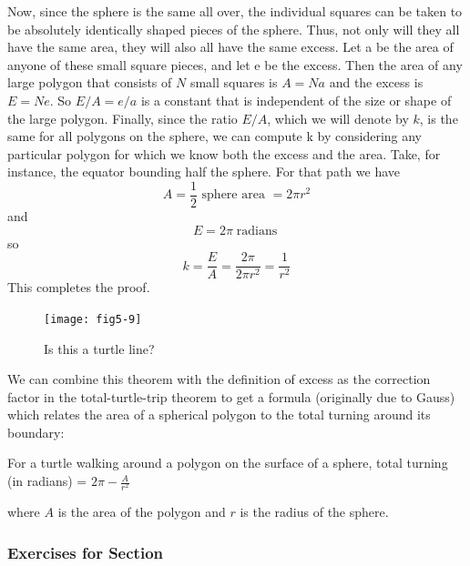 \documentclass{book}
\begin{document}
Now, since the sphere is the same all over, the individual squares can
be taken to be absolutely identically shaped pieces of the sphere. Thus,
not only will they all have the same area, they will also all have the same
excess. Let a be the area of anyone of these small square pieces, and let
e be the excess. Then the area of any large polygon that consists of $N$
small squares is $A = Na$ and the excess is $E = Ne$. So $E/A = e/a$ is
a constant that is independent of the size or shape of the large polygon.
Finally, since the ratio $E / A$, which we will denote by $k$, is the same
for all polygons on the sphere, we can compute k by considering any
particular polygon for which we know both the excess and the area.
Take, for instance, the equator bounding half the sphere. For that path
we have
$$A = \frac{1}{2} \text{ sphere area } = 2 \pi r^2$$
 and
$$E = 2 \pi \operatorname{radians}$$
 so
$$k = \frac{E}{A}=\frac{2 \pi}{2 \pi r^2}=\frac{1}{r^2}$$
 This completes the proof.

\begin{figure}
\begin{center}
\texttt{[image: fig5-9]}
\caption{Is this a turtle line?}
\end{center}
\end{figure}

We can combine this theorem with the definition of excess as the 
correction factor in the total-turtle-trip theorem to get a formula (originally
due to Gauss) which relates the area of a spherical polygon to the total
turning around its boundary:

For a turtle walking around a polygon on the surface of a sphere,
total turning (in radians) = $2 \pi - \frac{A}{r^2}$

where $A$ is the area of the polygon and $r$ is the radius of the sphere.

\subsubsection{Exercises for Section \thesection}
\end{document}
